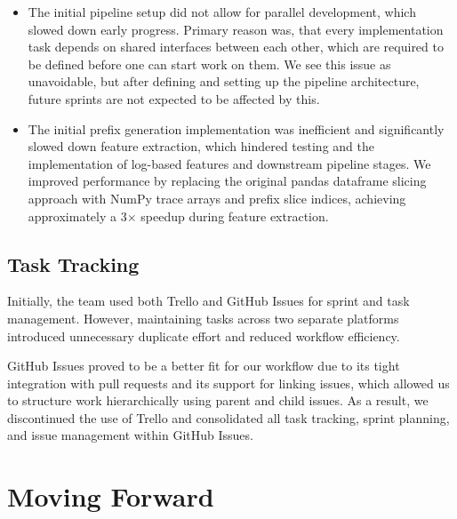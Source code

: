 \documentclass[runningheads]{llncs}
\begin{document}
\begin{itemize}
    \item The initial pipeline setup did not allow for parallel development, which slowed down early progress. Primary reason was, that every implementation task depends on shared interfaces between each other, which are required to be defined before one can start work on them. We see this issue as unavoidable, but after defining and setting up the pipeline architecture, future sprints are not expected to be affected by this.

    \item The initial prefix generation implementation was inefficient and significantly slowed down feature extraction, which hindered testing and the implementation of log-based features and downstream pipeline stages. We improved performance by replacing the original pandas dataframe slicing approach with NumPy trace arrays and prefix slice indices, achieving approximately a 3$\times$ speedup during feature extraction.
\end{itemize}

\subsection{Task Tracking}
Initially, the team used both Trello and GitHub Issues for sprint and task management. However, maintaining tasks across two separate platforms introduced unnecessary duplicate effort and reduced workflow efficiency.

GitHub Issues proved to be a better fit for our workflow due to its tight integration with pull requests and its support for linking issues, which allowed us to structure work hierarchically using parent and child issues. As a result, we discontinued the use of Trello and consolidated all task tracking, sprint planning, and issue management within GitHub Issues.


\section{Moving Forward}
\end{document}
